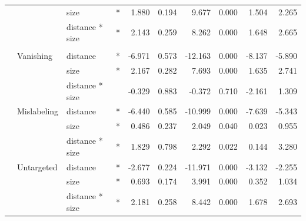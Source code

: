 \begin{longtable}[t]{llllrrrrrr}
\cmidrule{3-10}\nopagebreak
\hspace{1em} &  & size & * & 1.880 & 0.194 & 9.677 & 0.000 & 1.504 & 2.265\\
\cmidrule{3-10}\nopagebreak
\hspace{1em} &  & distance * size & * & 2.143 & 0.259 & 8.262 & 0.000 & 1.648 & 2.665\\
\cmidrule{1-10}\pagebreak[0]
\addlinespace[0.3em]
\multicolumn{10}{l}{\textbf{Cascade R-CNN}}\\
\hspace{1em} & Vanishing & distance & * & -6.971 & 0.573 & -12.163 & 0.000 & -8.137 & -5.890\\
\cmidrule{3-10}\nopagebreak
\hspace{1em} &  & size & * & 2.167 & 0.282 & 7.693 & 0.000 & 1.635 & 2.741\\
\cmidrule{3-10}\nopagebreak
\hspace{1em} &  & distance * size &  & -0.329 & 0.883 & -0.372 & 0.710 & -2.161 & 1.309\\
\cmidrule{2-10}\nopagebreak
\hspace{1em} & Mislabeling & distance & * & -6.440 & 0.585 & -10.999 & 0.000 & -7.639 & -5.343\\
\cmidrule{3-10}\nopagebreak
\hspace{1em} &  & size & * & 0.486 & 0.237 & 2.049 & 0.040 & 0.023 & 0.955\\
\cmidrule{3-10}\nopagebreak
\hspace{1em} &  & distance * size & * & 1.829 & 0.798 & 2.292 & 0.022 & 0.144 & 3.280\\
\cmidrule{2-10}\nopagebreak
\hspace{1em} & Untargeted & distance & * & -2.677 & 0.224 & -11.971 & 0.000 & -3.132 & -2.255\\
\cmidrule{3-10}\nopagebreak
\hspace{1em} &  & size & * & 0.693 & 0.174 & 3.991 & 0.000 & 0.352 & 1.034\\
\cmidrule{3-10}\nopagebreak
\hspace{1em} &  & distance * size & * & 2.181 & 0.258 & 8.442 & 0.000 & 1.678 & 2.693\\
\bottomrule
\end{longtable}
\endgroup{}

